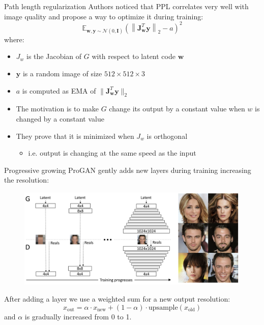 \documentclass[handout, 10pt]{beamer}
\begin{document}
\begin{frame}{Path length regularization}
Authors noticed that PPL correlates very well with image quality and propose a way to optimize it during training:
\begin{equation}
\mathbb{E}_{\mathbf{w}, \mathbf{y} \sim \mathcal{N}(0, \mathbf{I})}\left(\left\|\mathbf{J}_{\mathbf{w}}^{T} \mathbf{y}\right\|_{2}-a\right)^{2}
\end{equation}
where:
\begin{itemize}
    \item $J_w$ is the Jacobian of $G$ with respect to latent code $\bm w$
    \item $\bm y$ is a random image of size $512\times 512 \times 3$
    \item $a$ is computed as EMA of $\|\mathbf{J}_{\mathbf{w}}^{T} \mathbf{y}\|_{2}$
    \item\pause The motivation is to make $G$ change its output by a constant value when $w$ is changed by a constant value
    \item\pause They prove that it is minimized when $J_w$ is orthogonal
    \begin{itemize}
        \item\pause i.e. output is changing at the same speed as the input
    \end{itemize}
\end{itemize}
\end{frame}

\begin{frame}{Progressive growing}
ProGAN gently adds new layers during training increasing the resolution:
\begin{figure}
\centering
\includegraphics[width=\textwidth]{images/progressive-growing}
\end{figure}

\pause
After adding a layer we use a weighted sum for a new output resolution:
\begin{equation}
x_\text{out} = \alpha \cdot x_\text{new} + (1 - \alpha) \cdot \text{upsample}(x_\text{old})
\end{equation}
and $\alpha$ is gradually increased from 0 to 1.
\end{frame}
\end{document}
